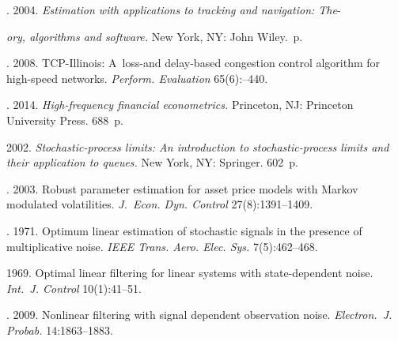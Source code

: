   \begin{multicols}{2}

\renewcommand{\bibname}{\protect\rmfamily References}

{\small\frenchspacing
 {%
 \begin{thebibliography}{99}
. 2004.
\textit{Estimation with applications to tracking and navigation: 
The}-\linebreak\vspace*{-12pt}

\columnbreak

\noindent
\textit{ory, 
algorithms and software.} New York, NY: John Wiley.~p.

. 2008.
TCP-Illinois: A~loss-and delay-based congestion control algorithm
  for high-speed networks. \textit{Perform. Evaluation} 65(6):--440.

. 2014.
\textit{High-frequency financial econometrics.} Princeton, NJ:
Princeton University Press. 688~p.

 2002.
\textit{Stochastic-process limits: An introduction to
  stochastic-process limits and their application to queues.}
 New York, NY: Springer. 602~p.

. 2003.
Robust parameter estimation for asset price models with Markov
  modulated volatilities. \textit{J.~Econ. Dyn. Control} 27(8):1391--1409.

 

. 1971.
Optimum linear estimation of stochastic signals in the presence of
  multiplicative noise. \textit{IEEE Trans. Aero. Elec. Sys.} 7(5):462--468.
  
  

 1969. 
Optimal linear filtering for linear systems with state-dependent noise.
\textit{Int.~J. Control} 10(1):41--51.

. 
2009. Nonlinear filtering with signal dependent observation
noise. \textit{Electron.~J. Probab.} 14:1863--1883.


\end{thebibliography}}}
\end{multicols}
